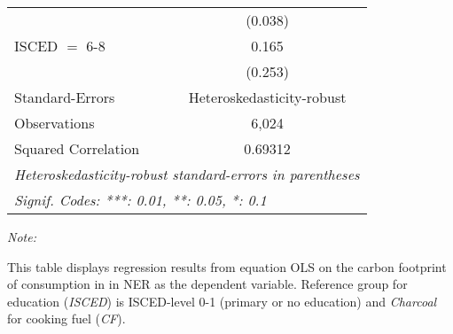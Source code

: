 \begin{table}[htbp!]
\begin{adjustbox}{width = 1\textwidth, max height = 0.95\textheight, center}
\begin{threeparttable}[b]
\begin{tabular}{lc}
                                & (0.038)\\   
            ISCED $=$ 6-8       & 0.165\\   
                                & (0.253)\\   
            \midrule 
            Standard-Errors     & Heteroskedasticity-robust \\   
            Observations        & 6,024\\  
            Squared Correlation & 0.69312\\  
            \midrule \midrule
            \multicolumn{2}{l}{\emph{Heteroskedasticity-robust standard-errors in parentheses}}\\
            \multicolumn{2}{l}{\emph{Signif. Codes: ***: 0.01, **: 0.05, *: 0.1}}\\
         \end{tabular}
         
         \begin{tablenotes}\item \medskip \textit{Note:}
            \item This table displays regression results from equation OLS on the carbon footprint of consumption in  in NER as the dependent variable.  Reference group for education (\textit{ISCED}) is ISCED-level 0-1 (primary or no education) and \textit{Charcoal} for cooking fuel (\textit{CF}).
         \end{tablenotes}
      \end{threeparttable}
   \end{adjustbox}
\end{table}


